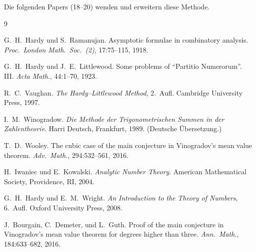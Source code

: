 \documentclass[12pt,a4paper]{amsart}
\theoremstyle{definition}
\begin{document}
Die folgenden Papers (18--20) wenden und erweitern diese Methode.

\begin{thebibliography}{9}

G.~H.~Hardy und S.~Ramanujan.
\newblock Asymptotic formulae in combinatory analysis.
\newblock \emph{Proc.\ London Math.\ Soc.\ (2)}, 17:75--115, 1918.

G.~H.~Hardy und J.~E.~Littlewood.
\newblock Some problems of ``Partitio Numerorum''. III.
\newblock \emph{Acta Math.}, 44:1--70, 1923.

R.~C.~Vaughan.
\newblock \emph{The Hardy--Littlewood Method}, 2.~Aufl.
\newblock Cambridge University Press, 1997.

I.~M.~Winogradow.
\newblock \emph{Die Methode der Trigonometrischen Summen in der Zahlentheorie}.
\newblock Harri Deutsch, Frankfurt, 1989. (Deutsche Übersetzung.)

T.~D.~Wooley.
\newblock The cubic case of the main conjecture in Vinogradov's mean value theorem.
\newblock \emph{Adv.\ Math.}, 294:532--561, 2016.

H.~Iwaniec und E.~Kowalski.
\newblock \emph{Analytic Number Theory}.
\newblock American Mathematical Society, Providence, RI, 2004.

G.~H.~Hardy und E.~M.~Wright.
\newblock \emph{An Introduction to the Theory of Numbers}, 6.~Aufl.
\newblock Oxford University Press, 2008.

J.~Bourgain, C.~Demeter, und L.~Guth.
\newblock Proof of the main conjecture in Vinogradov's mean value theorem for degrees higher than three.
\newblock \emph{Ann.\ Math.}, 184:633--682, 2016.

\end{thebibliography}
\end{document}
